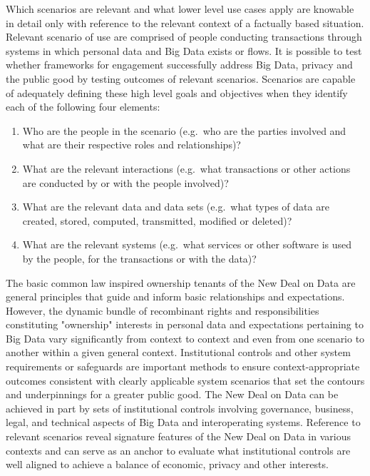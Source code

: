 Which scenarios are relevant and what lower level use cases apply are knowable in detail only with reference to the relevant context of a factually based situation.
Relevant scenario of use are comprised of people conducting transactions through systems in which personal data and Big Data exists or flows.
It is possible to test whether frameworks for engagement successfully address Big Data, privacy and the public good by testing outcomes of relevant scenarios. 
Scenarios are capable of adequately defining these high level goals and objectives when they identify each of the following four elements:  


\begin{enumerate}
\item Who are the people in the scenario (e.g.~who are the parties involved and what are their respective roles and relationships)? 
\item What are the relevant interactions (e.g.~what transactions or other actions are conducted by or with the people involved)?
\item What are the relevant data and data sets (e.g.~what types of data are created, stored, computed, transmitted, modified or deleted)?
\item What are the relevant systems (e.g.~what services or other software is used by the people, for the transactions or with the data)? 
\end{enumerate}


The basic common law inspired ownership tenants of the New Deal on Data are general principles that guide and inform basic relationships and expectations.
However, the dynamic bundle of recombinant rights and responsibilities constituting "ownership" interests in personal data and expectations pertaining to Big Data vary significantly from context to context and even from one scenario to another within a given general context.  
Institutional controls and other system requirements or safeguards are important methods to ensure context-appropriate outcomes consistent with clearly applicable system scenarios that set the contours and underpinnings for a greater public good.
The New Deal on Data can be achieved in part by sets of institutional controls involving governance, business, legal, and technical aspects of Big Data and interoperating systems.
Reference to relevant scenarios reveal signature features of the New Deal on Data in various contexts and can serve as an anchor to evaluate what institutional controls are well aligned to achieve a balance of economic, privacy and other interests. 



